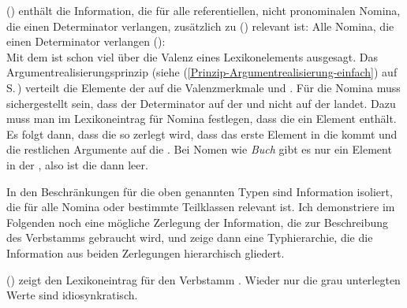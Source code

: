 () enthält die Information, die für alle referentiellen, nicht pronominalen Nomina,
die einen Determinator verlangen, zusätzlich zu () relevant ist:
\ea
Alle Nomina, die einen Determinator verlangen ():\\
\z
Mit dem \argstw ist schon viel über die Valenz eines Lexikonelements ausgesagt. Das
Argumentrealisierungsprinzip (siehe (\ref{Prinzip-Argumentrealisierung-einfach}) auf
S.\,\pageref{Prinzip-Argumentrealisierung-einfach}) verteilt die Elemente der \argstl auf die
Valenzmerkmale \spr und \comps. Für die Nomina muss sichergestellt sein, dass der Determinator auf
der \sprl und nicht auf der \compsl landet. Dazu muss man im Lexikoneintrag für Nomina festlegen,
dass die \sprl ein Element enthält. Es folgt dann, dass die \argstl so zerlegt wird, dass das erste
Element in die \sprl kommt und die restlichen Argumente auf die \compsl. Bei Nomen wie \emph{Buch}
gibt es nur ein Element in der \argstl, also ist die \compsl dann leer. 


In den Beschränkungen für die oben genannten Typen sind Information isoliert, die für alle Nomina oder bestimmte Teilklassen
relevant ist. Ich demonstriere im Folgenden noch eine mögliche Zerlegung der Information, die zur Beschreibung
des Verbstamms  gebraucht wird, und zeige dann eine Typhierarchie,
die die Information aus beiden Zerlegungen hierarchisch gliedert.

() zeigt den Lexikoneintrag für den Verbstamm . Wieder nur die
grau unterlegten Werte sind idiosynkratisch.
\ea
{}
\z

